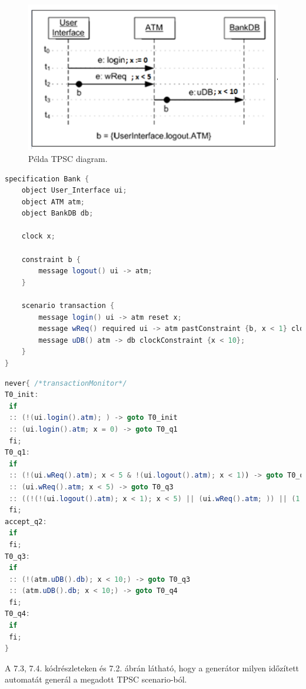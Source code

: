 \begin{figure}[h!]
    \centering
    \includegraphics[width=150mm, keepaspectratio]{figures/14abra.png}
    \caption{Példa TPSC diagram.}
\end{figure}

\begin{lstlisting}[language=java,frame=single, float=h!, caption={TPSC scenario szöveges leírása.},captionpos=b]
specification Bank {
	object User_Interface ui;
	object ATM atm;
	object BankDB db;

	clock x;

	constraint b {
		message logout() ui -> atm;
	}

	scenario transaction {
		message login() ui -> atm reset x;
		message wReq() required ui -> atm pastConstraint {b, x < 1} clockConstraint {x < 5};
		message uDB() atm -> db clockConstraint {x < 10};
	}
}
\end{lstlisting}

\begin{lstlisting}[language=java,frame=single, float=h!, caption={Generált időzített automata never claim formátumban.},captionpos=b]
never{ /*transactionMonitor*/
T0_init:
 if
 :: (!(ui.login().atm); ) -> goto T0_init
 :: (ui.login().atm; x = 0) -> goto T0_q1
 fi;
T0_q1:
 if
 :: (!(ui.wReq().atm); x < 5 & !(ui.logout().atm); x < 1)) -> goto T0_q1
 :: (ui.wReq().atm; x < 5) -> goto T0_q3
 :: ((!(!(ui.logout().atm); x < 1); x < 5) || (ui.wReq().atm; )) || (1, x >= 5))) -> goto accept_q2
 fi;
accept_q2:
 if
 fi;
T0_q3:
 if
 :: (!(atm.uDB().db); x < 10;) -> goto T0_q3
 :: (atm.uDB().db; x < 10;) -> goto T0_q4
 fi;
T0_q4:
 if
 fi;
}
\end{lstlisting}

A 7.3, 7.4. kódrészleteken és 7.2. ábrán látható, hogy a generátor milyen időzített automatát generál a megadott TPSC scenario-ból.